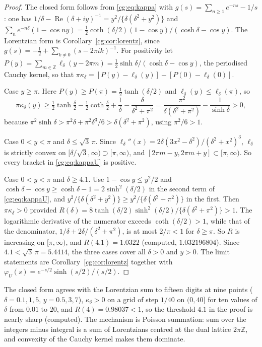 \begin{proof}
The closed form follows from \eqref{cg:eq:kappa} with $g(s)=\sum_{n\ge1}e^{-ns}-1/s$: one has $1/\delta-\operatorname{Re}(\delta+iy)^{-1}=y^2/\{\delta(\delta^2+y^2)\}$ and $\sum_ne^{-n\delta}(1-\cos ny)=\frac12\coth(\delta/2)(1-\cos y)/(\cosh\delta-\cos y)$. The Lorentzian form is Corollary~\ref{cg:cor:lorentz}, since $g(s)=-\frac12+\sum_{k\ne0}(s-2\pi ik)^{-1}$. For positivity let $P(y)=\sum_{m\in\mathbb Z}\ell_\delta(y-2\pi m)=\frac12\sinh\delta/(\cosh\delta-\cos y)$, the periodised Cauchy kernel, so that $\pi\kappa_\delta=[P(y)-\ell_\delta(y)]-[P(0)-\ell_\delta(0)]$.

Case $y\ge\pi$. Here $P(y)\ge P(\pi)=\frac12\tanh(\delta/2)$ and $\ell_\delta(y)\le\ell_\delta(\pi)$, so
\[
\pi\kappa_\delta(y)\ge\tfrac12\tanh\tfrac\delta2-\tfrac12\coth\tfrac\delta2+\frac1\delta-\frac{\delta}{\delta^2+\pi^2}=\frac{\pi^2}{\delta(\delta^2+\pi^2)}-\frac{1}{\sinh\delta}>0,
\]
because $\pi^2\sinh\delta>\pi^2\delta+\pi^2\delta^3/6>\delta(\delta^2+\pi^2)$, using $\pi^2/6>1$.

Case $0<y<\pi$ and $\delta\le\sqrt3\,\pi$. Since $\ell_\delta''(x)=2\delta(3x^2-\delta^2)/(\delta^2+x^2)^3$, $\ell_\delta$ is strictly convex on $[\delta/\sqrt3,\infty)\supset[\pi,\infty)$, and $[2\pi m-y,2\pi m+y]\subset[\pi,\infty)$. So every bracket in \eqref{cg:eq:kappaU} is positive.

Case $0<y<\pi$ and $\delta\ge4.1$. Use $1-\cos y\le y^2/2$ and $\cosh\delta-\cos y\ge\cosh\delta-1=2\sinh^2(\delta/2)$ in the second term of \eqref{cg:eq:kappaU}, and $y^2/\{\delta(\delta^2+y^2)\}\ge y^2/\{\delta(\delta^2+\pi^2)\}$ in the first. Then $\pi\kappa_\delta>0$ provided $R(\delta)=8\tanh(\delta/2)\sinh^2(\delta/2)/\{\delta(\delta^2+\pi^2)\}>1$. The logarithmic derivative of the numerator exceeds $\coth(\delta/2)>1$, while that of the denominator, $1/\delta+2\delta/(\delta^2+\pi^2)$, is at most $2/\pi<1$ for $\delta\ge\pi$. So $R$ is increasing on $[\pi,\infty)$, and $R(4.1)=1.0322$ (computed, $1.032196804$). Since $4.1<\sqrt3\,\pi=5.4414$, the three cases cover all $\delta>0$ and $y>0$. The limit statements are Corollary~\ref{cg:cor:lorentz} together with $\varphi_U(s)=e^{-s/2}\sinh(s/2)/(s/2)$.
\end{proof}

The closed form agrees with the Lorentzian sum to fifteen digits at nine points ($\delta=0.1,1,5$, $y=0.5,3,7$), $\kappa_\delta>0$ on a grid of step $1/40$ on $(0,40]$ for ten values of $\delta$ from $0.01$ to $20$, and $R(4)=0.98037<1$, so the threshold $4.1$ in the proof is nearly sharp (computed). The mechanism is Poisson summation: sum over the integers minus integral is a sum of Lorentzians centred at the dual lattice $2\pi\mathbb{Z}$, and convexity of the Cauchy kernel makes them dominate.

